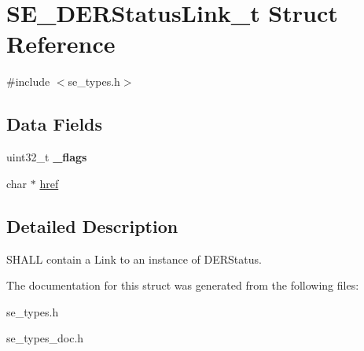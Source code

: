 \hypertarget{structSE__DERStatusLink__t}{}\section{S\+E\+\_\+\+D\+E\+R\+Status\+Link\+\_\+t Struct Reference}
\label{structSE__DERStatusLink__t}


{\ttfamily \#include $<$se\+\_\+types.\+h$>$}

\subsection*{Data Fields}
\begin{DoxyCompactItemize}
\item 
uint32\+\_\+t {\bfseries \+\_\+flags}
\item 
char $\ast$ \hyperlink{group__DERStatusLink_gab9af51bb715d8cc4ee56d55d62641657}{href}
\end{DoxyCompactItemize}


\subsection{Detailed Description}
S\+H\+A\+LL contain a Link to an instance of D\+E\+R\+Status. 

The documentation for this struct was generated from the following files\+:\begin{DoxyCompactItemize}
\item 
se\+\_\+types.\+h\item 
se\+\_\+types\+\_\+doc.\+h\end{DoxyCompactItemize}
